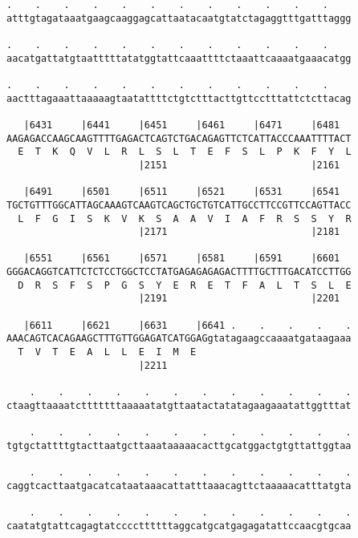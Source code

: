 \documentclass{article}
\begin{document}
\begin{Verbatim}
.    .    .    .    .    .    .    .    .    .    .    .    
atttgtagataaatgaagcaaggagcattaatacaatgtatctagaggtttgatttaggg
                                                            
.    .    .    .    .    .    .    .    .    .    .    .    
aacatgattatgtaatttttatatggtattcaaattttctaaattcaaaatgaaacatgg
                                                            
.    .    .    .    .    .    .    .    .    .    .    .    
aactttagaaattaaaaagtaatattttctgtctttacttgttcctttattctcttacag
                                                            
   |6431     |6441     |6451     |6461     |6471     |6481  
AAGAGACCAAGCAAGTTTTGAGACTCAGTCTGACAGAGTTCTCATTACCCAAATTTTACT
  E  T  K  Q  V  L  R  L  S  L  T  E  F  S  L  P  K  F  Y  L
                       |2151                         |2161  
  
   |6491     |6501     |6511     |6521     |6531     |6541  
TGCTGTTTGGCATTAGCAAAGTCAAGTCAGCTGCTGTCATTGCCTTCCGTTCCAGTTACC
  L  F  G  I  S  K  V  K  S  A  A  V  I  A  F  R  S  S  Y  R
                       |2171                         |2181  
  
   |6551     |6561     |6571     |6581     |6591     |6601  
GGGACAGGTCATTCTCTCCTGGCTCCTATGAGAGAGAGACTTTTGCTTTGACATCCTTGG
  D  R  S  F  S  P  G  S  Y  E  R  E  T  F  A  L  T  S  L  E
                       |2191                         |2201  
  
   |6611     |6621     |6631     |6641 .    .    .    .    .
AAACAGTCACAGAAGCTTTGTTGGAGATCATGGAGgtatagaagccaaaatgataagaaa
  T  V  T  E  A  L  L  E  I  M  E                           
                       |2211                                
  
    .    .    .    .    .    .    .    .    .    .    .    .
ctaagttaaaatctttttttaaaaatatgttaatactatatagaagaaatattggtttat
                                                            
    .    .    .    .    .    .    .    .    .    .    .    .
tgtgctattttgtacttaatgcttaaataaaaacacttgcatggactgtgttattggtaa
                                                            
    .    .    .    .    .    .    .    .    .    .    .    .
caggtcacttaatgacatcataataaacattatttaaacagttctaaaaacatttatgta
                                                            
    .    .    .    .    .    .    .    .    .    .    .    .
caatatgtattcagagtatccccttttttaggcatgcatgagagatattccaacgtgcaa
                                                            

\end{Verbatim}
\end{document}
